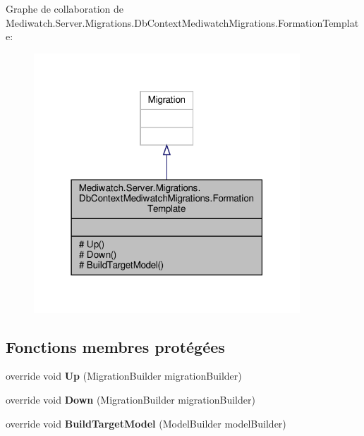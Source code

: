 Graphe de collaboration de Mediwatch.\+Server.\+Migrations.\+Db\+Context\+Mediwatch\+Migrations.\+Formation\+Template\+:\nopagebreak
\begin{figure}[H]
\begin{center}
\leavevmode
\includegraphics[width=283pt]{class_mediwatch_1_1_server_1_1_migrations_1_1_db_context_mediwatch_migrations_1_1_formation_template__coll__graph}
\end{center}
\end{figure}
\subsection*{Fonctions membres protégées}
\begin{DoxyCompactItemize}
\item 
\mbox{\label{class_mediwatch_1_1_server_1_1_migrations_1_1_db_context_mediwatch_migrations_1_1_formation_template_a764ae13cba383217b4e7139bc5a9b66f}} 
override void {\bfseries Up} (Migration\+Builder migration\+Builder)
\item 
\mbox{\label{class_mediwatch_1_1_server_1_1_migrations_1_1_db_context_mediwatch_migrations_1_1_formation_template_a150807df85878a16eeeebe56483a607d}} 
override void {\bfseries Down} (Migration\+Builder migration\+Builder)
\item 
\mbox{\label{class_mediwatch_1_1_server_1_1_migrations_1_1_db_context_mediwatch_migrations_1_1_formation_template_a09d9c079b563d7491d1a743e484ae716}} 
override void {\bfseries Build\+Target\+Model} (Model\+Builder model\+Builder)
\end{DoxyCompactItemize}


